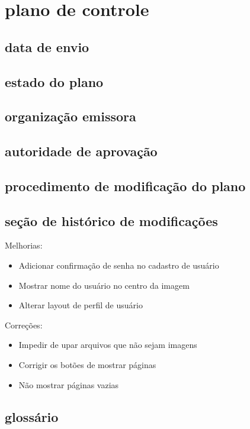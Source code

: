 \chapter{plano de controle}

\section{data de envio}

\section{estado do plano}

\section{organização emissora}

\section{autoridade de aprovação}

\section{procedimento de modificação do plano}

\section{seção de histórico de modificações}

Melhorias:

 \begin{itemize}
   \item Adicionar confirmação de senha no cadastro de usuário
   \item Mostrar nome do usuário no centro da imagem
   \item Alterar layout de perfil de usuário
 \end{itemize}

Correções:

 \begin{itemize}
   \item Impedir de upar arquivos que não sejam imagens
   \item Corrigir os botões de mostrar páginas
   \item Não mostrar páginas vazias
 \end{itemize}

\section{glossário}
